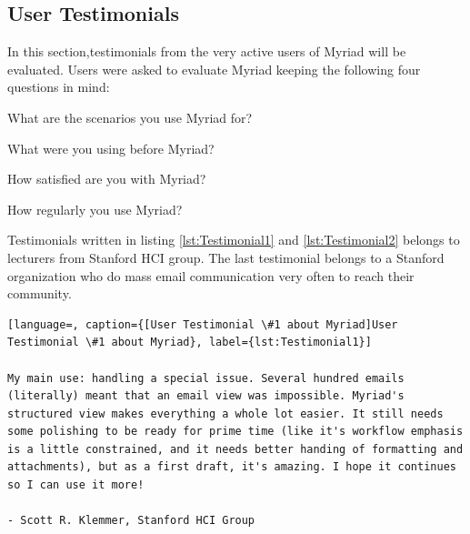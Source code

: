 \subsection{User Testimonials}
\label{subsec:5.4.2:UserTest}

In this section,testimonials from the very active users of Myriad will be evaluated. Users were asked to evaluate Myriad keeping the following four questions in mind:

\begin{compactenum}
	\item What are the scenarios you use Myriad for?
	\item What were you using before Myriad?
	\item How satisfied are you with Myriad?
	\item How regularly you use Myriad?
\end{compactenum}

Testimonials written in listing \ref{lst:Testimonial1} and \ref{lst:Testimonial2} belongs to lecturers from Stanford \ac{HCI} group. The last testimonial belongs to a Stanford organization who do mass email communication very often to reach their community.

\vspace{1cm}

\clearpage


\begin{lstlisting}[language=, caption={[User Testimonial \#1 about Myriad]User Testimonial \#1 about Myriad}, label={lst:Testimonial1}]

My main use: handling a special issue. Several hundred emails (literally) meant that an email view was impossible. Myriad's structured view makes everything a whole lot easier. It still needs some polishing to be ready for prime time (like it's workflow emphasis is a little constrained, and it needs better handing of formatting and attachments), but as a first draft, it's amazing. I hope it continues so I can use it more!

- Scott R. Klemmer, Stanford HCI Group
\end{lstlisting}

\vspace{1cm}

